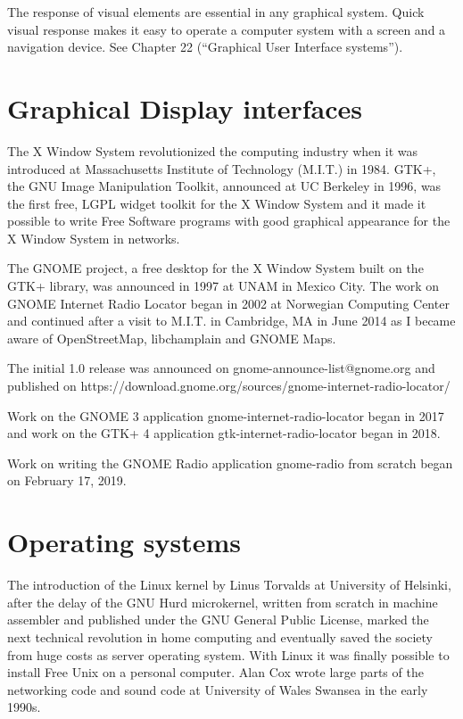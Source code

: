 \documentclass[a4paper,norsk,utf8]{report}
\begin{document}
    The response of visual elements are essential in any graphical system.
    Quick visual response makes it easy to operate a computer system with
    a screen and a navigation device.  See Chapter 22 (``Graphical User Interface systems'').

\chapter{Graphical Display interfaces}

    The X Window System revolutionized the computing industry when it
    was introduced at Massachusetts Institute of Technology (M.I.T.)
    in 1984.  GTK+, the GNU Image Manipulation Toolkit, announced at
    UC Berkeley in 1996, was the first free, LGPL widget toolkit for
    the X Window System and it made it possible to write Free Software
    programs with good graphical appearance for the X Window System in
    networks.

    The GNOME project, a free desktop for the X Window System built on
    the GTK+ library, was announced in 1997 at UNAM in Mexico City.
    The work on GNOME Internet Radio Locator began in 2002 at
    Norwegian Computing Center and continued after a visit to
    M.I.T. in Cambridge, MA in June 2014 as I became aware of
    OpenStreetMap, libchamplain and GNOME Maps.

    The initial 1.0 release was announced on
    gnome-announce-list@gnome.org and published on
    https://download.gnome.org/sources/gnome-internet-radio-locator/

    Work on the GNOME 3 application gnome-internet-radio-locator began in
    2017 and work on the GTK+ 4 application gtk-internet-radio-locator began
    in 2018.

    Work on writing the GNOME Radio application gnome-radio from scratch
    began on February 17, 2019.

\chapter{Operating systems}

    The introduction of the Linux kernel by Linus Torvalds at
    University of Helsinki, after the delay of the GNU Hurd
    microkernel, written from scratch in machine assembler and
    published under the GNU General Public License, marked the next
    technical revolution in home computing and eventually saved the
    society from huge costs as server operating system.  With Linux it
    was finally possible to install Free Unix on a personal computer.
    Alan Cox wrote large parts of the networking code and sound code
    at University of Wales Swansea in the early 1990s.
\end{document}
